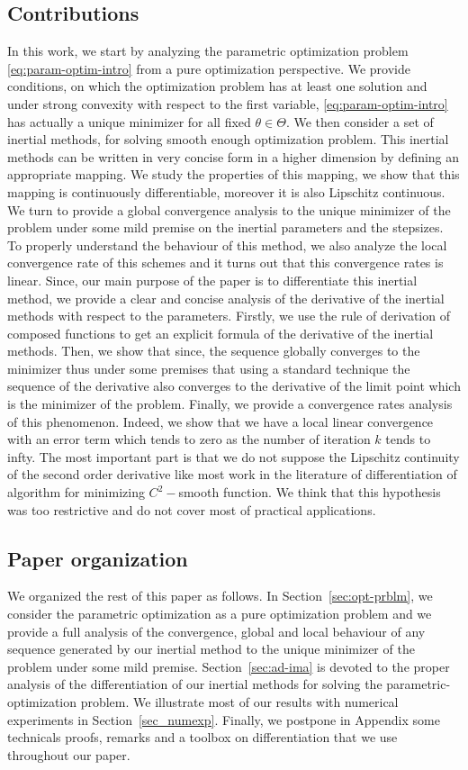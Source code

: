 \subsection{Contributions}
In this work, we start by analyzing  the parametric optimization problem \eqref{eq:param-optim-intro} from a pure optimization perspective. We provide  conditions, on which the optimization problem has at least one solution and under strong convexity with respect to the first variable, \eqref{eq:param-optim-intro} has actually  a unique minimizer for all fixed $\theta\in\Theta$. We then consider a set of inertial methods, for solving smooth enough optimization problem. This inertial methods can be written in very concise form in a higher dimension by defining an appropriate mapping. We study the properties of this mapping, we show that this mapping is continuously differentiable, moreover it is also Lipschitz continuous. We turn to provide a  global convergence analysis to the unique minimizer of the problem under some mild premise on the inertial parameters and the stepsizes. To properly understand the behaviour of this method, we also analyze  the local convergence rate of this schemes and it turns out that this convergence rates is linear. Since, our main purpose of the paper is to differentiate this inertial method, we provide a clear and concise analysis of the derivative of the inertial methods with respect to the parameters. Firstly, we use the rule of derivation of composed functions to get an explicit formula of the derivative of the inertial methods. Then, we show that  since, the sequence globally converges to the minimizer thus under some premises that using a  standard technique  the sequence of the derivative also converges to the derivative of the limit point which is the minimizer of the problem. Finally, we provide a  convergence rates analysis of this phenomenon. Indeed, we show that we have a local linear convergence with an error term which tends to zero  as  the number of iteration $k$ tends to infty. The most important part is that we do not suppose the Lipschitz continuity of the second order derivative like most work in the literature of differentiation of algorithm for minimizing  $C^2-$smooth function. We think that this hypothesis was too restrictive and do not cover most of practical applications. 

\subsection{Paper organization}

We organized the rest of this paper  as follows. In Section~\ref{sec:opt-prblm}, we consider the parametric optimization as a pure optimization problem  and we provide a full analysis of the convergence, global and local behaviour of any sequence generated by our inertial method to the unique minimizer of the problem under some mild premise.  Section~\ref{sec:ad-ima}  is devoted to  the proper analysis of the  differentiation of our inertial methods for solving  the parametric-optimization problem. We  illustrate most of our results with numerical experiments in  Section~\ref{sec_numexp}. Finally, we postpone in Appendix some technicals proofs, remarks and a toolbox on  differentiation that we use throughout our paper.


